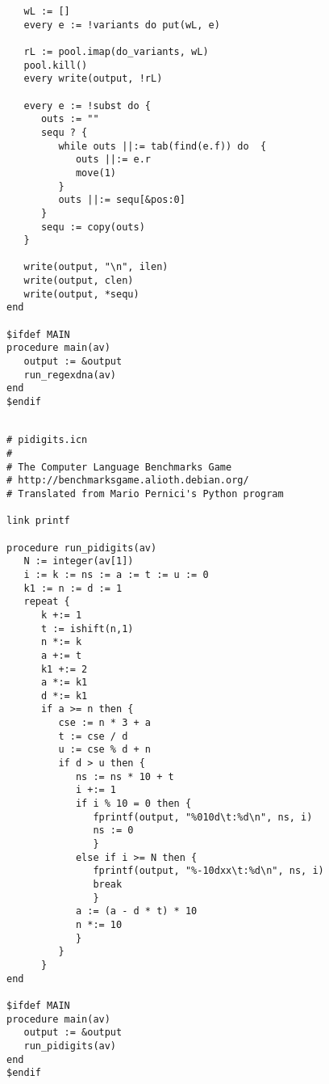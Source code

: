 \documentclass[letterpaper,12pt]{article}
\begin{document}
\begin{verbatim}
   wL := []
   every e := !variants do put(wL, e)

   rL := pool.imap(do_variants, wL)
   pool.kill()
   every write(output, !rL)
   
   every e := !subst do {
      outs := ""   
      sequ ? {
         while outs ||:= tab(find(e.f)) do  {
            outs ||:= e.r
            move(1)
         }
         outs ||:= sequ[&pos:0]
      }
      sequ := copy(outs)
   }

   write(output, "\n", ilen)
   write(output, clen)
   write(output, *sequ)
end

$ifdef MAIN
procedure main(av)
   output := &output
   run_regexdna(av)
end
$endif

\end{verbatim}

\newpage

\begin{verbatim}

# pidigits.icn
#
# The Computer Language Benchmarks Game
# http://benchmarksgame.alioth.debian.org/
# Translated from Mario Pernici's Python program

link printf

procedure run_pidigits(av)
   N := integer(av[1])
   i := k := ns := a := t := u := 0
   k1 := n := d := 1
   repeat {
      k +:= 1
      t := ishift(n,1)
      n *:= k
      a +:= t
      k1 +:= 2
      a *:= k1
      d *:= k1
      if a >= n then {
         cse := n * 3 + a
         t := cse / d
         u := cse % d + n
         if d > u then {
            ns := ns * 10 + t
            i +:= 1
            if i % 10 = 0 then {
               fprintf(output, "%010d\t:%d\n", ns, i)
               ns := 0
               }
            else if i >= N then {
               fprintf(output, "%-10dxx\t:%d\n", ns, i)
               break
               }
            a := (a - d * t) * 10
            n *:= 10
            }
         }
      }
end

$ifdef MAIN
procedure main(av)
   output := &output
   run_pidigits(av)
end
$endif

\end{verbatim}

\newpage
\end{document}
